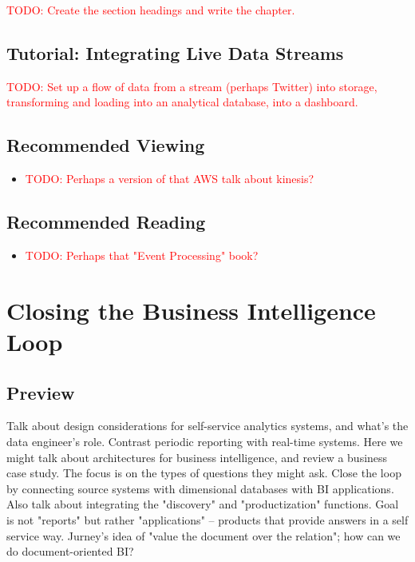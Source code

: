 \documentclass[11pt]{book}
\newcommand{\todo}[1]{\textcolor{red}{TODO: #1}} %
\begin{document}
\todo{Create the section headings and write the chapter.}

\section*{Tutorial: Integrating Live Data Streams}

\todo{Set up a flow of data from a stream (perhaps Twitter) into storage, transforming and loading into an analytical database, into a dashboard.}

\section*{Recommended Viewing}
\begin{itemize}
    \item \todo{Perhaps a version of that AWS talk about kinesis?}
\end{itemize}

\section*{Recommended Reading}
\begin{itemize}
    \item \todo{Perhaps that "Event Processing" book?}
\end{itemize}








\chapter{Closing the Business Intelligence Loop}

\section*{Preview}

Talk about design considerations for self-service analytics systems, and what's the data engineer's role.  Contrast periodic reporting with real-time systems.  Here we might talk about architectures for business intelligence, and review a business case study.  The focus is on the types of questions they might ask.  Close the loop by connecting source systems with dimensional databases with BI applications.  Also talk about integrating the "discovery" and "productization" functions.  Goal is not "reports" but rather "applications" -- products that provide answers in a self service way.  Jurney's idea of "value the document over the relation"; how can we do document-oriented BI?
\end{document}
